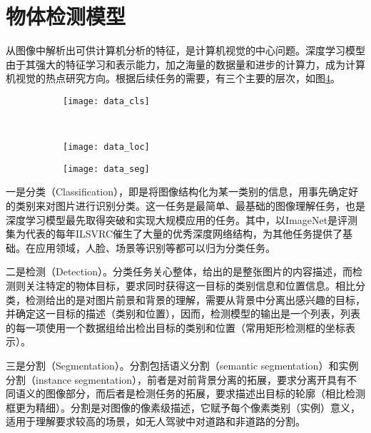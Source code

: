 \section{物体检测模型}
从图像中解析出可供计算机分析的特征，是计算机视觉的中心问题。深度学习模型由于其强大的特征学习和表示能力，加之海量的数据量和进步的计算力，成为计算机视觉的热点研究方向。根据后续任务的需要，有三个主要的层次，如图\ref{fig:dl_cv_task}。
\begin{figure}[htbp]
    \centering
    \begin{subfigure}[a]{0.6\textwidth}
      \texttt{[image: data\_cls]}
      \caption{}
      \label{fig:data_cls}
    \end{subfigure}%
    \qquad
    ~%
    \begin{subfigure}[b]{0.6\textwidth}
      \texttt{[image: data\_loc]}
      \caption{}
      \label{fig:data_loc}
    \end{subfigure}
    \qquad
    \begin{subfigure}[c]{0.6\textwidth}
      \texttt{[image: data\_seg]}
      \caption{}
      \label{fig:data_seg}
    \end{subfigure}

    \label{fig:dl_cv_task}
\end{figure}

一是分类（Classification），即是将图像结构化为某一类别的信息，用事先确定好的类别来对图片进行识别分类。这一任务是最简单、最基础的图像理解任务，也是深度学习模型最先取得突破和实现大规模应用的任务。其中，以ImageNet是评测集为代表的每年ILSVRC催生了大量的优秀深度网络结构，为其他任务提供了基础。在应用领域，人脸、场景等识别等都可以归为分类任务。

二是检测（Detection）。分类任务关心整体，给出的是整张图片的内容描述，而检测则关注特定的物体目标，要求同时获得这一目标的类别信息和位置信息。相比分类，检测给出的是对图片前景和背景的理解，需要从背景中分离出感兴趣的目标，并确定这一目标的描述（类别和位置），因而，检测模型的输出是一个列表，列表的每一项使用一个数据组给出检出目标的类别和位置（常用矩形检测框的坐标表示）。

三是分割（Segmentation）。分割包括语义分割（semantic segmentation）和实例分割（instance segmentation），前者是对前背景分离的拓展，要求分离开具有不同语义的图像部分，而后者是检测任务的拓展，要求描述出目标的轮廓（相比检测框更为精细）。分割是对图像的像素级描述，它赋予每个像素类别（实例）意义，适用于理解要求较高的场景，如无人驾驶中对道路和非道路的分割。

